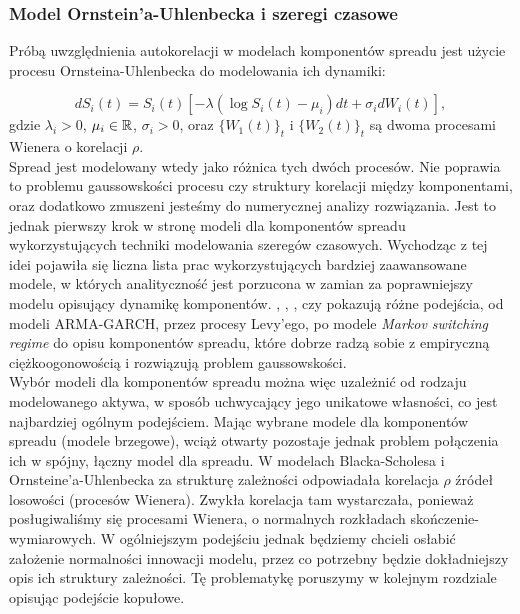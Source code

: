 \subsubsection{Model Ornstein'a-Uhlenbecka i szeregi czasowe}

Próbą uwzględnienia autokorelacji w modelach komponentów spreadu jest użycie procesu Ornsteina-Uhlenbecka do modelowania ich dynamiki:

$$ dS_i(t) =S_i(t)[-\lambda (\log S_i(t) - \mu_i)dt + \sigma_i dW_i(t)],$$
gdzie $\lambda_i>0$,  $\mu_i \in \mathbb{R}$, $\sigma_i >0$, oraz $\{W_1(t)\}_t$ i $\{W_2(t)\}_t$ są dwoma procesami Wienera o korelacji $\rho$.\\

Spread jest modelowany wtedy jako różnica tych dwóch procesów. Nie poprawia to problemu gaussowskości procesu czy struktury korelacji między komponentami, oraz dodatkowo zmuszeni jesteśmy do numerycznej analizy rozwiązania. Jest to jednak pierwszy krok w stronę modeli dla komponentów spreadu wykorzystujących techniki modelowania szeregów czasowych. Wychodząc z tej idei pojawiła się liczna lista prac wykorzystujących bardziej zaawansowane modele, w których analityczność jest porzucona w zamian za poprawniejszy modelu opisujący dynamikę komponentów. \cite{Herath_Copula_Crack_Spread}, \cite{Boubaker_Markov_Copula}, \cite{Espen_Crack_Spread_Copula}, czy \cite{Bernard_Pricing_Multivariate_Options_with_copulae} pokazują różne podejścia, od modeli ARMA-GARCH, przez procesy Levy'ego, po modele \emph{Markov switching regime} do opisu komponentów spreadu, które dobrze radzą sobie z empiryczną ciężkoogonowością i rozwiązują problem gaussowskości.\\

Wybór modeli dla komponentów spreadu można więc uzależnić od rodzaju modelowanego aktywa, w sposób uchwycający jego unikatowe własności, co jest najbardziej ogólnym podejściem. Mając wybrane modele dla komponentów spreadu (modele brzegowe), wciąż otwarty pozostaje jednak problem połączenia ich w spójny, łączny model dla spreadu. W modelach Blacka-Scholesa i Ornsteine'a-Uhlenbecka za strukturę zależności odpowiadała korelacja $\rho$ źródeł losowości (procesów Wienera). Zwykła korelacja tam wystarczała, ponieważ posługiwaliśmy się procesami Wienera, o normalnych rozkładach skończenie-wymiarowych. W ogólniejszym podejściu jednak będziemy chcieli osłabić założenie normalności innowacji modelu, przez co potrzebny będzie dokładniejszy opis ich struktury zależności. Tę problematykę poruszymy w kolejnym rozdziale opisując podejście kopułowe.